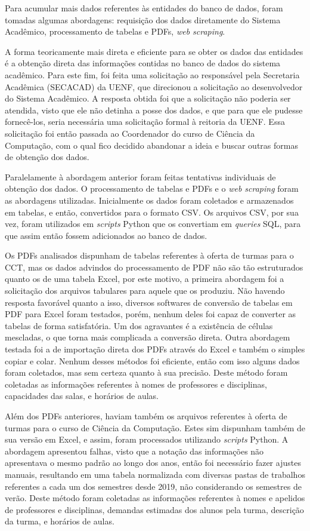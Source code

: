 Para acumular mais dados referentes às entidades do banco de dados, foram tomadas algumas abordagens: requisição dos dados diretamente do Sistema Acadêmico, processamento de tabelas e PDFs, \textit{web scraping}.

A forma teoricamente mais direta e eficiente para se obter os dados das entidades é a obtenção direta das informações contidas no banco de dados do sistema acadêmico. Para este fim, foi feita uma solicitação ao responsável pela Secretaria Acadêmica (SECACAD) da UENF, que direcionou a solicitação ao desenvolvedor do Sistema Acadêmico. A resposta obtida foi que a solicitação não poderia ser atendida, visto que ele não detinha a posse dos dados, e que para que ele pudesse fornecê-los, seria necessária uma solicitação formal à reitoria da UENF. Essa solicitação foi então passada ao Coordenador do curso de Ciência da Computação, com o qual fico decidido abandonar a ideia e buscar outras formas de obtenção dos dados.

Paralelamente à abordagem anterior foram feitas tentativas individuais de obtenção dos dados. O processamento de tabelas e PDFs e o \textit{web scraping} foram as abordagens utilizadas. Inicialmente os dados foram coletados e armazenados em tabelas, e então, convertidos para o formato CSV. Os arquivos CSV, por sua vez, foram utilizados em \textit{scripts} Python que os convertiam em \textit{queries} SQL, para que assim então fossem adicionados ao banco de dados.

Os PDFs analisados dispunham de tabelas referentes à oferta de turmas para o CCT, mas os dados advindos do processamento de PDF não são tão estruturados quanto os de uma tabela Excel, por este motivo, a primeira abordagem foi a solicitação dos arquivos tabulares para aquele que os produziu. Não havendo resposta favorável quanto a isso, diversos softwares de conversão de tabelas em PDF para Excel foram testados, porém, nenhum deles foi capaz de converter as tabelas de forma satisfatória. Um dos agravantes é a existência de células mescladas, o que torna mais complicada a conversão direta. Outra abordagem testada foi a de importação direta dos PDFs através do Excel e também o simples copiar e colar. Nenhum desses métodos foi eficiente, então com isso alguns dados foram coletados, mas sem certeza quanto à sua precisão. Deste método foram coletadas as informações referentes à nomes de professores e disciplinas, capacidades das salas, e horários de aulas.

Além dos PDFs anteriores, haviam também os arquivos referentes à oferta de turmas para o curso de Ciência da Computação. Estes sim dispunham também de sua versão em Excel, e assim, foram processados utilizando \textit{scripts} Python. A abordagem apresentou falhas, visto que a notação das informações não apresentava o mesmo padrão ao longo dos anos, então foi necessário fazer ajustes manuais, resultando em uma tabela normalizada com diversas pastas de trabalhos referentes a cada um dos semestres desde 2019, não considerando os semestres de verão. Deste método foram coletadas as informações referentes à nomes e apelidos de professores e disciplinas, demandas estimadas dos alunos pela turma, descrição da turma, e horários de aulas.

